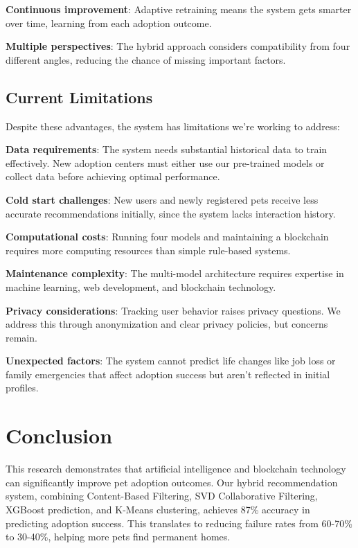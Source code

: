 \documentclass[conference]{IEEEtran}
\begin{document}
\textbf{Continuous improvement}: Adaptive retraining means the system gets smarter over time, learning from each adoption outcome.

\textbf{Multiple perspectives}: The hybrid approach considers compatibility from four different angles, reducing the chance of missing important factors.

\subsection{Current Limitations}

Despite these advantages, the system has limitations we're working to address:

\textbf{Data requirements}: The system needs substantial historical data to train effectively. New adoption centers must either use our pre-trained models or collect data before achieving optimal performance.

\textbf{Cold start challenges}: New users and newly registered pets receive less accurate recommendations initially, since the system lacks interaction history.

\textbf{Computational costs}: Running four models and maintaining a blockchain requires more computing resources than simple rule-based systems.

\textbf{Maintenance complexity}: The multi-model architecture requires expertise in machine learning, web development, and blockchain technology.

\textbf{Privacy considerations}: Tracking user behavior raises privacy questions. We address this through anonymization and clear privacy policies, but concerns remain.

\textbf{Unexpected factors}: The system cannot predict life changes like job loss or family emergencies that affect adoption success but aren't reflected in initial profiles.

\section{Conclusion}

This research demonstrates that artificial intelligence and blockchain technology can significantly improve pet adoption outcomes. Our hybrid recommendation system, combining Content-Based Filtering, SVD Collaborative Filtering, XGBoost prediction, and K-Means clustering, achieves 87\% accuracy in predicting adoption success. This translates to reducing failure rates from 60-70\% to 30-40\%, helping more pets find permanent homes.
\end{document}
